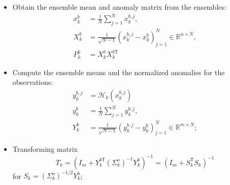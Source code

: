 \documentclass{article}
\newcommand{\trans}{\mathsf{T}}
\begin{document}
\begin{itemize}
	\item Obtain the ensemble mean and anomaly matrix from the ensembles:
	      \begin{align*}
		      x_k^b & = \frac1N\sum_{j=1}^Nx_k^{b,j},                                           \\
		      X_k^b & = \frac1{\sqrt{N-1}}(x_k^{b,j} - x_k^b)_{j=1}^N\in\mathbb{R}^{n\times N}, \\
		      P_k^b & = X_k^bX_k^{b\trans}
	      \end{align*}
	\item Compute the ensemble means and the normalized anomalies for the observations:
	      \begin{align*}
		      y_k^{b,j} & = \mathcal{H}_k(x_k^{b,j})                                                \\
		      y_k^b     & = \frac1N\sum_{j=1}^Ny_k^{b,j},                                           \\
		      Y_k^b     & = \frac1{\sqrt{N-1}}(y_k^{b,j} - y_k^b)_{j=1}^N\in\mathbb{R}^{m\times N};
	      \end{align*}
	\item Transforming matrix
	      $$
		      T_k = (I_m+Y_k^{b\trans}(\Sigma_k^o)^{-1}Y_k^b)^{-1} = (I_m + S_k^\trans S_k)^{-1}
	      $$
	      for $S_k=(\Sigma_k^o)^{-1/2}Y_k^b$;


\end{itemize}
\end{document}
